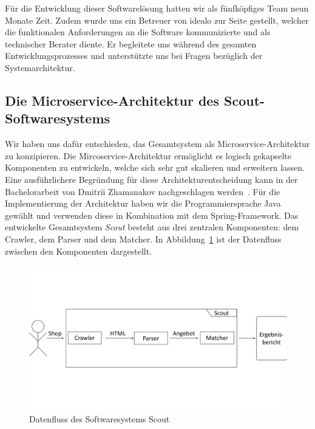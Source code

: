 Für die Entwicklung dieser Softwarelösung hatten wir als fünfköpfiges Team neun Monate Zeit.
Zudem wurde uns ein Betreuer von idealo zur Seite gestellt, welcher die funktionalen Anforderungen an die
Software kommunizierte und als technischer Berater diente.
Er begleitete uns während des gesamten Entwicklungsprozesses und unterstützte uns bei Fragen bezüglich der
Systemarchitektur.

\subsection{Die Microservice-Architektur des Scout-Softwaresystems}
\label{subsec:microservice-architektur}

Wir haben uns dafür entschieden, das Gesamtsystem als Microservice-Architektur zu konzipieren.
Die Mircoservice-Architektur ermöglicht es logisch gekapselte Komponenten zu entwickeln, welche sich sehr gut
skalieren und erweitern lassen.
Eine ausführlichere Begründung für diese Architekturentscheidung kann in der Bachelorarbeit von Dmitrii
Zhamanakov nachgeschlagen werden~\cite{thesis:dmitrii}.
Für die Implementierung der Architektur haben wir die Programmiersprache Java gewählt und verwenden diese in
Kombination mit dem Spring-Framework\footnotemark.
Das entwickelte Gesamtsystem \textit{Scout} besteht aus drei zentralen Komponenten: dem Crawler, dem Parser und dem
Matcher.
In Abbildung~\ref{abb:datenfluss-grob} ist der Datenfluss zwischen den Komponenten dargestellt.

\begin{figure}[H]
    \centering
    \includegraphics[width=\textwidth, trim=0 5.5cm 0 5.5cm, clip]{resources/Datenfluss-Gesamt-Grob.pdf}
    \caption{Datenfluss des Softwaresystems Scout}
    \label{abb:datenfluss-grob}
    \vspace{-0.25cm}
\end{figure}

